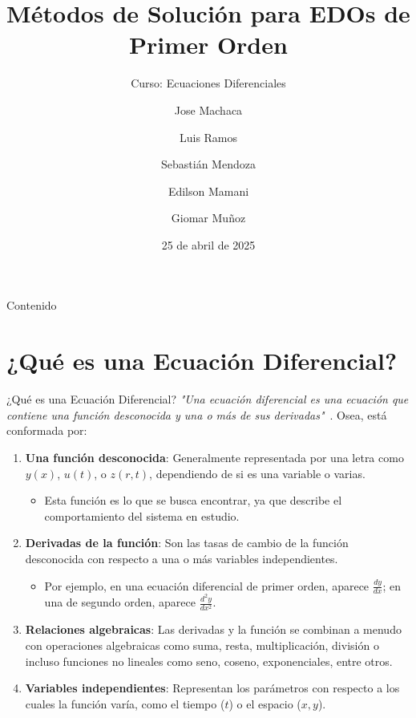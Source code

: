 \documentclass{beamer}
\title[Métodos EDO 1\textsuperscript{er} orden]{Métodos de Solución para EDOs de Primer Orden}
\subtitle{Curso: Ecuaciones Diferenciales}
\author{Jose Machaca \and Luis Ramos \and Sebastián Mendoza \and Edilson Mamani \and Giomar Muñoz}
\date{25 de abril de 2025}
\begin{document}
\begin{frame}
  \titlepage
\end{frame}

\begin{frame}{Contenido}
  \tableofcontents
\end{frame}

\section{¿Qué es una Ecuación Diferencial?}
\begin{frame}{¿Qué es una Ecuación Diferencial?}
\textit{"Una ecuación diferencial es una ecuación que contiene una función desconocida y una o más de sus derivadas"}~\cite{zill2009ecuaciones}.
Osea, está conformada por:
\begin{enumerate}
    \item \textbf{Una función desconocida}: Generalmente representada por una letra como \( y(x) \), \( u(t) \), o \( z(r, t) \), dependiendo de si es una variable o varias.
    \begin{itemize}
        \item Esta función es lo que se busca encontrar, ya que describe el comportamiento del sistema en estudio.
    \end{itemize}

    \item \textbf{Derivadas de la función}: Son las tasas de cambio de la función desconocida con respecto a una o más variables independientes.
    \begin{itemize}
        \item Por ejemplo, en una ecuación diferencial de primer orden, aparece \( \frac{dy}{dx} \); en una de segundo orden, aparece \( \frac{d^2y}{dx^2} \).
    \end{itemize}

    \item \textbf{Relaciones algebraicas}: Las derivadas y la función se combinan a menudo con operaciones algebraicas como suma, resta, multiplicación, división o incluso funciones no lineales como seno, coseno, exponenciales, entre otros.

    \item \textbf{Variables independientes}: Representan los parámetros con respecto a los cuales la función varía, como el tiempo (\(t\)) o el espacio (\(x, y\)).
\end{enumerate}
\end{frame}
\end{document}
